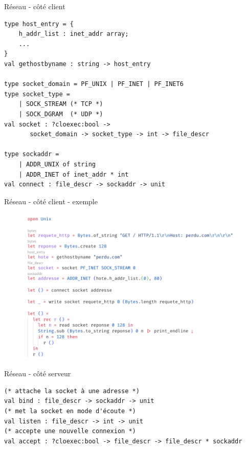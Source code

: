 
\begin{frame}[fragile]{Réseau - côté client}

\begin{lstlisting}
type host_entry = {
	h_addr_list : inet_addr array;
    ...
}
val gethostbyname : string -> host_entry

type socket_domain = PF_UNIX | PF_INET | PF_INET6
type socket_type = 
    | SOCK_STREAM (* TCP *) 
    | SOCK_DGRAM  (* UDP *)
val socket : ?cloexec:bool ->
       socket_domain -> socket_type -> int -> file_descr

type sockaddr = 
    | ADDR_UNIX of string
    | ADDR_INET of inet_addr * int
val connect : file_descr -> sockaddr -> unit
\end{lstlisting}

\end{frame}

\begin{frame}[fragile]{Réseau - côté client - exemple}

\begin{figure}
    \centering
    \includegraphics[width=\textwidth]{slides/images/unixsocket.png}
\end{figure}
    
\end{frame}

\begin{frame}[fragile]{Réseau - côté serveur}

\begin{lstlisting}
(* attache la socket à une adresse *)
val bind : file_descr -> sockaddr -> unit
(* met la socket en mode d'écoute *)
val listen : file_descr -> int -> unit
(* accepte une nouvelle connexion *)
val accept : ?cloexec:bool -> file_descr -> file_descr * sockaddr
\end{lstlisting}

\end{frame}


